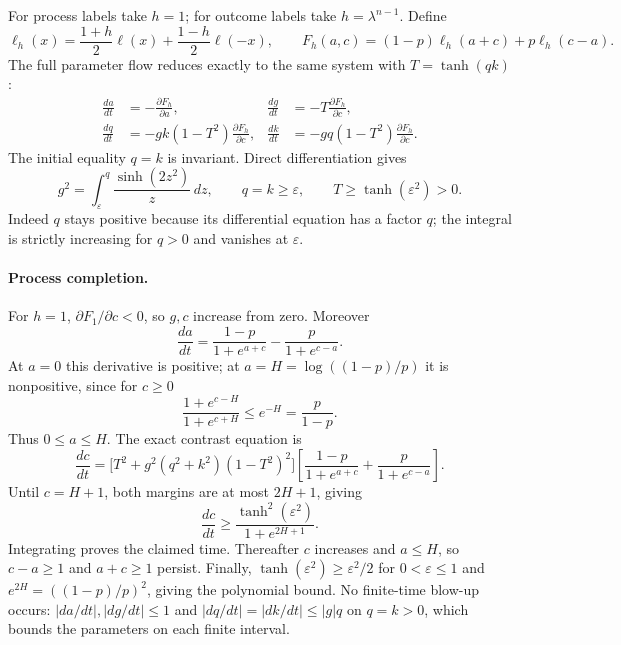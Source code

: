 For process labels take $h=1$; for outcome labels take $h=\lambda^{n-1}$.
Define
\[
 \ell_h(x)=\frac{1+h}{2}\ell(x)+\frac{1-h}{2}\ell(-x),\qquad
 F_h(a,c)=(1-p)\ell_h(a+c)+p\ell_h(c-a).
\]
The full parameter flow reduces exactly to the same system with $T=\tanh(qk)$:
\begin{equation}
\begin{aligned}
 \frac{da}{dt}&=-\frac{\partial F_h}{\partial a},&
 \frac{dg}{dt}&=-T\frac{\partial F_h}{\partial c},\\
 \frac{dq}{dt}&=-gk(1-T^2)\frac{\partial F_h}{\partial c},&
 \frac{dk}{dt}&=-gq(1-T^2)\frac{\partial F_h}{\partial c}.
\end{aligned}
\label{eq:two-path-common-flow}
\end{equation}
The initial equality $q=k$ is invariant. Direct differentiation gives
\begin{equation}
 g^2=\int_\varepsilon^q\frac{\sinh(2z^2)}{z}\,dz,
 \qquad q=k\ge\varepsilon,\qquad T\ge\tanh(\varepsilon^2)>0.
 \label{eq:two-path-factor-balance}
\end{equation}
Indeed $q$ stays positive because its differential equation has a factor $q$;
the integral is strictly increasing for $q>0$ and vanishes at $\varepsilon$.

\paragraph{Process completion.}
For $h=1$, $\partial F_1/\partial c<0$, so $g,c$ increase from zero. Moreover
\[
 \frac{da}{dt}=\frac{1-p}{1+e^{a+c}}-\frac{p}{1+e^{c-a}}.
\]
At $a=0$ this derivative is positive; at $a=H=\log((1-p)/p)$ it is nonpositive,
since for $c\ge0$
\[
 \frac{1+e^{c-H}}{1+e^{c+H}}\le e^{-H}=\frac{p}{1-p}.
\]
Thus $0\le a\le H$. The exact contrast equation is
\[
 \frac{dc}{dt}
 =\bigl[T^2+g^2(q^2+k^2)(1-T^2)^2\bigr]
 \left[\frac{1-p}{1+e^{a+c}}+\frac{p}{1+e^{c-a}}\right].
\]
Until $c=H+1$, both margins are at most $2H+1$, giving
\[
 \frac{dc}{dt}\ge\frac{\tanh^2(\varepsilon^2)}{1+e^{2H+1}}.
\]
Integrating proves the claimed time. Thereafter $c$ increases and $a\le H$, so
$c-a\ge1$ and $a+c\ge1$ persist. Finally,
$\tanh(\varepsilon^2)\ge\varepsilon^2/2$ for $0<\varepsilon\le1$ and
$e^{2H}=((1-p)/p)^2$, giving the polynomial bound.
No finite-time blow-up occurs: $|da/dt|,|dg/dt|\le1$ and
$|dq/dt|=|dk/dt|\le |g|q$ on $q=k>0$, which bounds the parameters on each finite interval.

